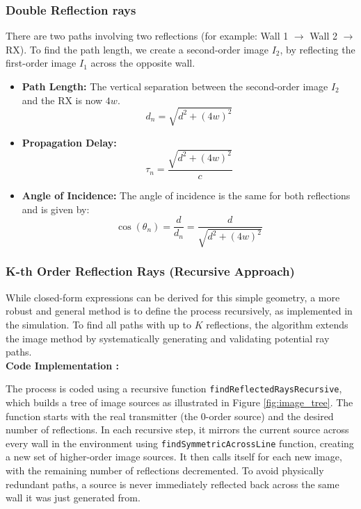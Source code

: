 \subsubsection{Double Reflection rays}
There are two paths involving two reflections (for example: Wall 1 $\rightarrow$ Wall 2 $\rightarrow$ RX). To find the path length, we create a second-order image $I_2$, by reflecting the first-order image $I_1$ across the opposite wall.
\begin{itemize}
	\item \textbf{Path Length:} The vertical separation between the second-order image $I_2$ and the RX is now $4w$.
	\begin{equation}
		d_{n} = \sqrt{d^2 + (4w)^2}
	\end{equation}
	\item \textbf{Propagation Delay:}
	\begin{equation}
		\tau_{n} = \frac{\sqrt{d^2 + (4w)^2}}{c}
	\end{equation}
	 \item \textbf{Angle of Incidence:} The angle of incidence is the same for both reflections and is given by:
	\begin{equation}
		\cos(\theta_{n}) = \frac{d}{d_{n}} = \frac{d}{\sqrt{d^2 + (4w)^2}}
	\end{equation}
\end{itemize}


\subsubsection{K-th Order Reflection Rays (Recursive Approach)}
While closed-form expressions can be derived for this simple geometry, a more robust and general method is to define the process recursively, as implemented in the simulation. To find all paths with up to $K$ reflections, the algorithm extends the image method by systematically generating and validating potential ray paths. \\

\textbf{Code Implementation :}

The process is coded using a recursive function \texttt{findReflectedRaysRecursive}, which builds a tree of image sources as illustrated in Figure \ref{fig:image_tree}. The function starts with the real transmitter (the 0-order source) and the desired number of reflections. In each recursive step, it mirrors the current source across every wall in the environment using \texttt{findSymmetricAcrossLine} function, creating a new set of higher-order image sources. It then calls itself for each new image, with the remaining number of reflections decremented. To avoid physically redundant paths, a source is never immediately reflected back across the same wall it was just generated from.

